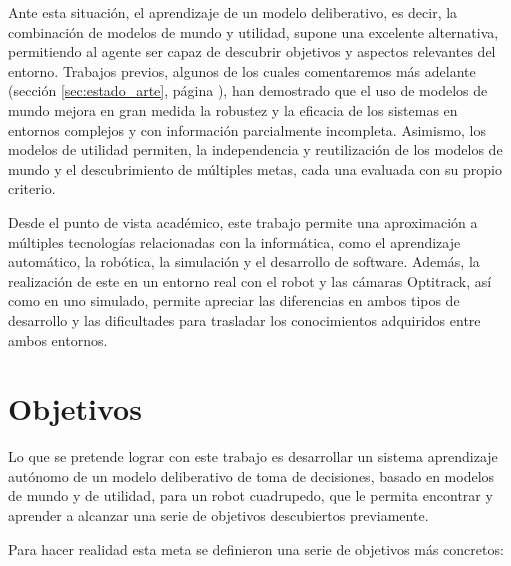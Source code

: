 Ante esta situación, el aprendizaje de un modelo deliberativo, es decir, la combinación de modelos de mundo 
y utilidad, supone una excelente alternativa, permitiendo al agente ser capaz de descubrir objetivos y 
aspectos relevantes del entorno.
Trabajos previos, algunos de los cuales comentaremos más adelante (sección \ref{sec:estado_arte}, página \pageref{sec:estado_arte}), 
han demostrado que el uso de modelos de mundo mejora en gran medida la robustez y la eficacia de los sistemas 
en entornos complejos y con información parcialmente incompleta. Asimismo, los modelos de utilidad permiten, la independencia y reutilización 
de los modelos de mundo y el descubrimiento de múltiples metas, cada una evaluada con su propio criterio.

Desde el punto de vista académico, este trabajo permite una aproximación a múltiples tecnologías relacionadas 
con la informática, como el aprendizaje automático, la robótica, la simulación y el desarrollo de software. 
Además, la realización de este en un entorno real con el robot y las cámaras Optitrack, así como en uno simulado, 
permite apreciar las diferencias en ambos tipos de desarrollo y las dificultades para trasladar los conocimientos 
adquiridos entre ambos entornos. 


\section{Objetivos}
\label{sec:objetivos}

Lo que se pretende lograr con este trabajo es desarrollar un sistema aprendizaje autónomo de un modelo deliberativo 
de toma de decisiones, basado en modelos de mundo y de utilidad, para un robot cuadrupedo, que le permita encontrar 
y aprender a alcanzar una serie de objetivos descubiertos previamente.

Para hacer realidad esta meta se definieron una serie de objetivos más concretos:

